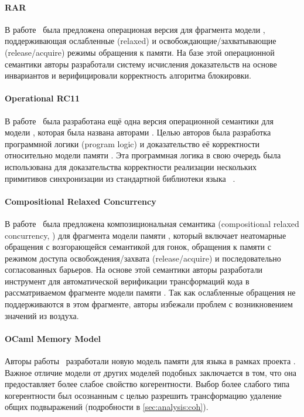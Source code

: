 \paragraph{RAR}

В работе~\cite{Doherty-al:PPoPP19} была предложена 
операционая версия для фрагмента модели \RCMM,
поддерживающая ослабленные (relaxed) и
освобождающие/захватывающие (release/acquire)
режимы обращения к памяти. 
На базе этой операционной семантики 
авторы разработали систему исчисления доказательств 
на основе инвариантов и верифицировали корректность
алгоритма блокировки. 

\paragraph{Operational RC11}

В работе~\cite{Dang-al:POPL19} была разработана 
ещё одна версия операционной семантики для модели \RCMM, 
которая была названа авторами \ORCMM.
Целью авторов была разработка программной логики 
(program logic) и доказательство её корректности 
относительно модели памяти \ORCMM.
Эта программная логика в свою очередь была использована
для доказательства корректности реализации нескольких 
примитивов синхронизации из стандартной библиотеки
языка \Rust~\cite{RustBook:19}.

\paragraph{Compositional Relaxed Concurrency}

В работе~\cite{Dodds-al:ESOP18} была предложена 
композициональная семантика (compositional relaxed concurrency, \CRC) 
для фрагмента модели памяти \CMM, 
который включает неатомарные обращения с возгорающейся семантикой для гонок, 
обращения к памяти с режимом доступа освобождения/захвата (release/acquire)
и последовательно согласованных барьеров. 
На основе этой семантики авторы разработали инструмент для 
автоматической верификации трансформаций кода
в рассматриваемом фрагменте модели памяти \CMM.
Так как ослабленные обращения не поддерживаются в этом фрагменте, 
авторы избежали проблем с возникновением значений из воздуха. 

\paragraph{OCaml Memory Model}

Авторы работы~\cite{Dolan-al:PLDI18} разработали новую модель памяти \OCMM
для языка \OCaml в рамках проекта \MOCaml.
Важное отличие модели \OCMM от других моделей подобных \CMM 
заключается в том, что она предоставляет более слабое свойство когерентности. 
Выбор более слабого типа когерентности был осознанным с целью 
разрешить трансформацию удаление общих подвыражений 
(\see подробности в \cref{sec:analysis:coh}).

